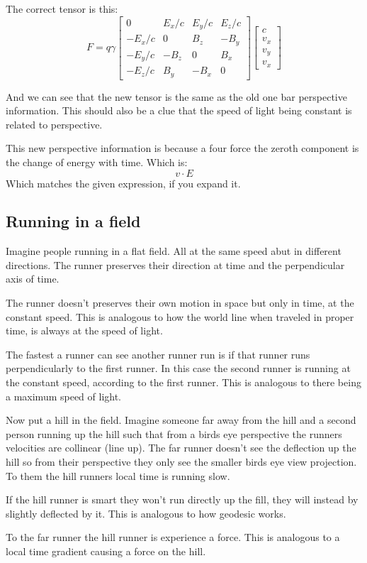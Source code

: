 The correct tensor is this:
\[ F= q\gamma\begin{bmatrix}0 & E_x/c & E_y/c & E_z/c \\-E_x/c & 0 & B_z & -B_y \\ -E_y/c & -B_z & 0 & B_x \\ -E_z/c & B_y & -B_x & 0 \end{bmatrix}\begin{bmatrix}c \\v_x \\ v_y \\ v_x \end{bmatrix}\]

And we can see that the new tensor is the same as the old one bar perspective information.
This should also be a clue that the speed of light being constant is related to perspective.

This new perspective information is because a four force the zeroth component is the change of energy with time.
Which is:
\[v\cdot E\]
Which matches the given expression, if you expand it.

\subsection{Running in a field}
Imagine people running in a flat field.
All at the same speed abut in different directions.
The runner preserves their direction at time and the perpendicular axis of time.

The runner doesn't preserves their own motion in space but only in time, at the constant speed.
This is analogous to how the world line when traveled in proper time, is always at the speed of light.

The fastest a runner can see another runner run is if that runner runs perpendicularly to the first runner.
In this case the second runner is running at the constant speed, according to the first runner.
This is analogous to there being a maximum speed of light.

Now put a hill in the field.
Imagine someone far away from the hill and a second person running up the hill such that from a birds eye perspective the runners velocities are collinear (line up).
The far runner doesn't see the deflection up the hill so from their perspective they only see the smaller birds eye view projection.
To them the hill runners local time is running slow.

If the hill runner is smart they won't run directly up the fill, they will instead by slightly deflected by it.
This is analogous to how geodesic works.

To the far runner the hill runner is experience a force.
This is analogous to a local time gradient causing a force on the hill.
